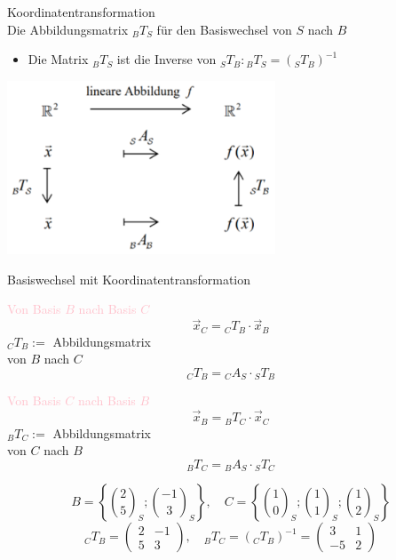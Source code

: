 \begin{concept}{Koordinatentransformation}\\
    Die Abbildungsmatrix ${ }_{B} T_{S}$ für den Basiswechsel von $S$ nach $B$
    \begin{itemize}
    \item Die Matrix ${ }_{B} T_{S}$ ist die Inverse von ${ }_{S} T_{B}:{ }_{B} T_{S}=\left({ }_{S} T_{B}\right)^{-1}$
    \end{itemize}
    \begin{center}
    \includegraphics[width=0.6\textwidth]{koordinatentransformation.png}
    \end{center}
\end{concept}

\begin{KR}{Basiswechsel mit Koordinatentransformation}\\
    \begin{minipage}{0.45\linewidth}
        \textcolor{pink}{Von Basis $B$ nach Basis $C$}
        $$
        \vec{x}_{C}={ }_{C} T_{B} \cdot \vec{x}_{B}
        $$
        ${ }_{C} T_{B} :=$ Abbildungsmatrix\\ von $B$ nach $C$
        $${ }_{C} T_{B} = { }_{C} A_{S} \cdot { }_{S} T_{B}$$
    \end{minipage}
    \hspace{3mm}
    \begin{minipage}{0.45\linewidth}
        \textcolor{pink}{Von Basis $C$ nach Basis $B$}
        $$
        \vec{x}_{B}={ }_{B} T_{C} \cdot \vec{x}_{C}
        $$
        ${ }_{B} T_{C} :=$ Abbildungsmatrix\\ von $C$ nach $B$
        $${ }_{B} T_{C} = { }_{B} A_{S} \cdot { }_{S} T_{C}$$
    \end{minipage}
\end{KR}

\begin{example}
    $$
    B=\left\{\binom{2}{5}_{S} ;\binom{-1}{3}_{S}\right\}, \quad C=\left\{\binom{1}{0}_{S} ;\binom{1}{1}_{S} ;\binom{1}{2}_{S}\right\}
    $$
    $$
    { }_{C} T_{B}=\left(\begin{array}{cc}
    2 & -1 \\
    5 & 3
    \end{array}\right), \quad { }_{B} T_{C}=\left({ }_{C} T_{B}\right)^{-1}=\left(\begin{array}{cc}
    3 & 1 \\
    -5 & 2
    \end{array}\right)
    $$
\end{example}

